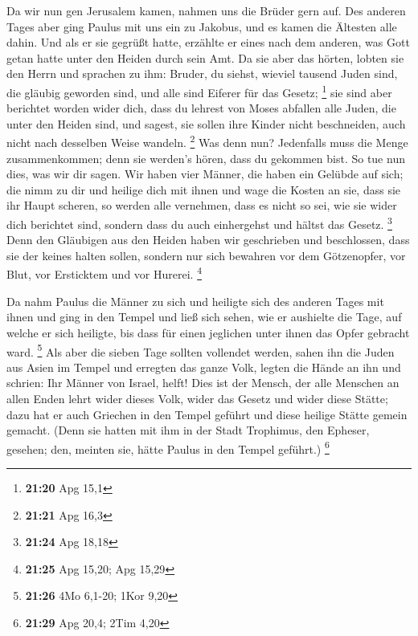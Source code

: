  Da wir nun gen Jerusalem kamen, nahmen uns die Brüder
gern auf.  Des anderen Tages aber ging Paulus mit uns ein
zu Jakobus, und es kamen die Ältesten alle dahin.  Und
als er sie gegrüßt hatte, erzählte er eines nach dem anderen, was Gott
getan hatte unter den Heiden durch sein Amt.  Da sie aber
das hörten, lobten sie den Herrn und sprachen zu ihm: Bruder, du siehst,
wieviel tausend Juden sind, die gläubig geworden sind, und alle sind
Eiferer für das Gesetz; \footnote{\textbf{21:20} Apg 15,1}
 sie sind aber berichtet worden wider dich, dass du
lehrest von Moses abfallen alle Juden, die unter den Heiden sind, und
sagest, sie sollen ihre Kinder nicht beschneiden, auch nicht nach
desselben Weise wandeln. \footnote{\textbf{21:21} Apg 16,3}
 Was denn nun? Jedenfalls muss die Menge zusammenkommen;
denn sie werden's hören, dass du gekommen bist.  So tue
nun dies, was wir dir sagen.  Wir haben vier Männer, die
haben ein Gelübde auf sich; die nimm zu dir und heilige dich mit ihnen
und wage die Kosten an sie, dass sie ihr Haupt scheren, so werden alle
vernehmen, dass es nicht so sei, wie sie wider dich berichtet sind,
sondern dass du auch einhergehst und hältst das Gesetz. \footnote{\textbf{21:24}
  Apg 18,18}  Denn den Gläubigen aus den Heiden haben wir
geschrieben und beschlossen, dass sie der keines halten sollen, sondern
nur sich bewahren vor dem Götzenopfer, vor Blut, vor Ersticktem und vor
Hurerei. \footnote{\textbf{21:25} Apg 15,20; Apg 15,29}

 Da nahm Paulus die Männer zu sich und heiligte sich des
anderen Tages mit ihnen und ging in den Tempel und ließ sich sehen, wie
er aushielte die Tage, auf welche er sich heiligte, bis dass für einen
jeglichen unter ihnen das Opfer gebracht ward. \footnote{\textbf{21:26}
  4Mo 6,1-20; 1Kor 9,20}  Als aber die sieben Tage
sollten vollendet werden, sahen ihn die Juden aus Asien im Tempel und
erregten das ganze Volk, legten die Hände an ihn und schrien:
 Ihr Männer von Israel, helft! Dies ist der Mensch, der
alle Menschen an allen Enden lehrt wider dieses Volk, wider das Gesetz
und wider diese Stätte; dazu hat er auch Griechen in den Tempel geführt
und diese heilige Stätte gemein gemacht.  (Denn sie
hatten mit ihm in der Stadt Trophimus, den Epheser, gesehen; den,
meinten sie, hätte Paulus in den Tempel geführt.) \footnote{\textbf{21:29}
  Apg 20,4; 2Tim 4,20}

